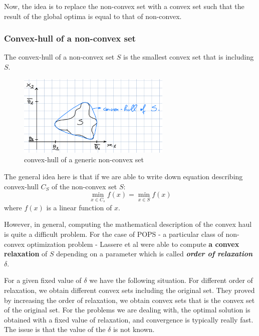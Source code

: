 Now, the idea is to replace the non-convex set with a convex set such that the result of the global optima is equal to that of non-convex.

\subsubsection{Convex-hull of a non-convex set}
The convex-hull of a non-convex set $S$ is
the smallest convex set that is including $S$.


\begin{figure}[htbp]  %
    \centering
    \includegraphics[width=0.65\textwidth]{images/convex-hull.png}
    \caption{convex-hull of a generic non-convex set}
    \label{fig:non-convex-FPS}
\end{figure}

The general idea here is that if we are able to write down equation describing convex-hull $C_S$ of the non-convex set $S$:
\[
\min\limits_{x \in C_s} f(x) = \min\limits_{x \in S} f(x)
\]
where $f(x)$ is a linear function of $x$.

However, in general, computing the mathematical description of the convex haul is quite a difficult problem. For the case of POPS - a particular class of non-convex optimization problem - Lassere et al were able to compute \textbf{a convex relaxation} of $S$ depending on a parameter which is called \textbf{\textit{order of relaxation $\delta$}}.

For a given fixed value of $\delta$ we have the following situation. For different order of relaxation, we obtain different convex sets including the original set. They proved by increasing the order of relaxation, we obtain convex sets that is the convex set of the original set. For the problems we are dealing with, the optimal solution is obtained with a fixed value of relaxation, and convergence is typically really fast. The issue is that the value of the $\delta$ is not known.

